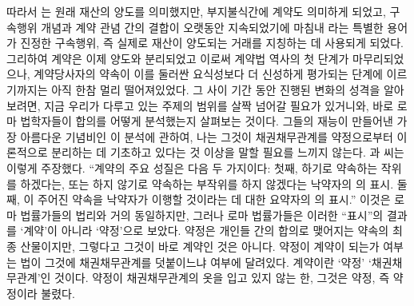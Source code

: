 따라서 는 원래 재산의 양도를 의미했지만,
부지불식간에 계약도 의미하게 되었고,
구속행위 개념과 계약 관념 간의 결합이 오랫동안 지속되었기에
마침내
라는 특별한 용어가
진정한 구속행위, 즉 실제로 재산이 양도되는 거래를 지칭하는 데
사용되게 되었다.
그리하여 계약은 이제 양도와 분리되었고
이로써 계약법 역사의 첫 단계가 마무리되었으나,
계약당사자의 약속이 이를 둘러싼 요식성보다 더 신성하게 평가되는
단계에 이르기까지는 아직 한참 멀리 떨어져있었다.
그 사이 기간 동안 진행된 변화의 성격을 알아보려면,
지금 우리가 다루고 있는 주제의 범위를 살짝 넘어갈 필요가 있거니와,
바로 로마 법학자들이 합의를 어떻게 분석했는지
살펴보는 것이다.
그들의 재능이 만들어낸 가장 아름다운 기념비인
이 분석에 관하여, 나는
그것이 채권채무관계를 약정으로부터
이론적으로 분리하는 데 기초하고 있다는 것 이상을 말할
필요를 느끼지 않는다.
과  씨는 이렇게 주장했다.
``계약의 주요 성질은 다음 두 가지이다:
첫째,
하기로 약속하는 작위를 하겠다는,
또는
하지 않기로 약속하는 부작위를 하지 않겠다는
낙약자의
의 표시.
둘째,
이 주어진 약속을 낙약자가 이행할 것이라는 데 대한
요약자의
의 표시.''
이것은
로마 법률가들의 법리와 거의 동일하지만,
그러나 로마 법률가들은
이러한 ``표시''의 결과를 `계약'이 아니라
`약정'으로 보았다.
약정은 개인들 간의 합의로 맺어지는 약속의 최종 산물이지만,
그렇다고 그것이 바로 계약인 것은 아니다.
약정이 계약이 되는가 여부는
법이 그것에 채권채무관계를 덧붙이느냐 여부에 달려있다.
계약이란 `약정'  `채권채무관계'인 것이다.
약정이 채권채무관계의 옷을 입고 있지 않는 한,
그것은 약정, 즉  약정이라 불렸다.

